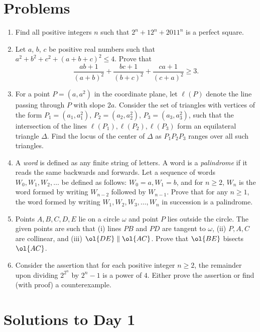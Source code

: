 \documentclass[11pt]{scrartcl}
\begin{document}
\section{Problems}
\begin{enumerate}[\bfseries 1.]
\item %
Find all positive integers $n$ such that $2^n+12^n+2011^n$ is a perfect square.

\item %
Let $a$, $b$, $c$ be positive real numbers
such that $a^2+b^2+c^2+(a+b+c)^2 \le 4$. Prove that
\[ \frac{ab+1}{(a+b)^2}
  + \frac{bc+1}{(b+c)^2}
  + \frac{ca+1}{(c+a)^2} \ge 3. \]

\item %
For a point $P = (a,a^2)$ in the coordinate plane,
let $\ell(P)$ denote the line passing through $P$ with slope $2a$.
Consider the set of triangles with vertices of the form
$P_1 = (a_1, a_1^2)$, $P_2 = (a_2, a_2^2)$, $P_3 = (a_3, a_3^2)$,
such that the intersection of the lines $\ell(P_1), \ell(P_2), \ell(P_3)$
form an equilateral triangle $\Delta$.
Find the locus of the center of $\Delta$ as $P_1P_2P_3$ ranges over all such triangles.

\item %
A \emph{word} is defined as any finite string of letters.
A word is a \emph{palindrome} if it reads the same backwards and forwards.
Let a sequence of words $W_0, W_1, W_2, \dots$ be defined as follows:
$W_0 = a, W_1 = b$, and for $n \ge 2$,
$W_n$ is the word formed by writing $W_{n-2}$ followed by $W_{n-1}$.
Prove that for any $n \ge 1$, the word formed by writing
$W_1, W_2, W_3, \dots, W_n$ in succession is a palindrome.

\item %
Points $A,B,C,D,E$ lie on a circle $\omega$
and point $P$ lies outside the circle.
The given points are such that
(i) lines $PB$ and $PD$ are tangent to $\omega$,
(ii) $P, A, C$ are collinear,
and (iii) $\ol{DE} \parallel \ol{AC}$.
Prove that $\ol{BE}$ bisects $\ol{AC}$.

\item %
Consider the assertion that for each positive integer $n\geq2$,
the remainder upon dividing $2^{2^n}$ by $2^n-1$ is a power of $4$.
Either prove the assertion or find (with proof) a counterexample.

\end{enumerate}
\pagebreak

\section{Solutions to Day 1}
\end{document}

